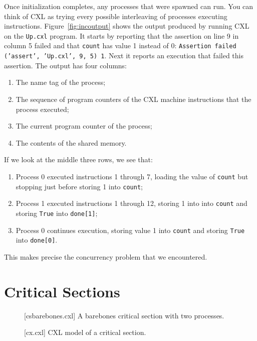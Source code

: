 \documentclass{report}
\newenvironment{code}{
\tcolorbox
}{
\endtcolorbox
}
\begin{document}
Once initialization completes, any processes that were spawned can run.
You can think of CXL as trying every possible interleaving of processes executing
instructions.
Figure~\ref{fig:incoutput} shows the output produced by running CXL on the
\texttt{Up.cxl} program.
It starts by reporting that the assertion on line 9 in column 5 failed and that
\texttt{count} has value 1 instead of 0:
\texttt{Assertion failed (’assert’, ’Up.cxl’, 9, 5) 1}.
Next it reports an execution that failed this assertion.  The output has
four columns:
\begin{enumerate}
\item The name tag of the process;
\item The sequence of program counters of the CXL machine instructions that the process executed;
\item The current program counter of the process;
\item The contents of the shared memory.
\end{enumerate}

If we look at the middle three rows, we see that:
\begin{enumerate}
\item Process 0 executed instructions 1 through 7, loading the value of
\texttt{count} but stopping just before storing 1 into \texttt{count};
\item Process 1 executed instructions 1 through 12, storing 1 into
into \texttt{count} and storing \texttt{True} into \texttt{done[1]};
\item Process 0 continues execution, storing value 1 into \texttt{count}
and storing \texttt{True} into \texttt{done[0]}.
\end{enumerate}

This makes precise the concurrency problem that we encountered.

\chapter{Critical Sections}

\begin{figure}
\begin{code}
\end{code}
\caption{[csbarebones.cxl] A barebones critical section with two processes.}
\label{fig:csbarebones}
\end{figure}

\begin{figure}
\begin{code}
\end{code}
\caption{[cx.cxl] CXL model of a critical section.}
\label{fig:cs}
\end{figure}
\end{document}
